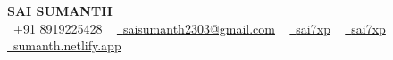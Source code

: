\documentclass[a4paper,10pt]{article}
\begin{document}

\begin{center}
    {\LARGE \textbf{SAI SUMANTH}} \\ [2pt]
    \small 
    \raisebox{-0.1\height}\faPhone\ +91 8919225428 ~ 
    \href{mailto:saisumanth2303@gmail.com}{\raisebox{-0.2\height}\faEnvelope\ {saisumanth2303@gmail.com}} ~ 
    \href{https://linkedin.com/in/sai7xp}{\raisebox{-0.2\height}\faLinkedin\ {sai7xp}} ~
    \href{https://github.com/sai7xp}{\raisebox{-0.2\height}\faGithub\ {sai7xp}} ~
    \href{https://sumanth.netlify.app/}{\raisebox{-0.2\height}\faGlobe\ {sumanth.netlify.app}}
\end{center}



\end{document}

